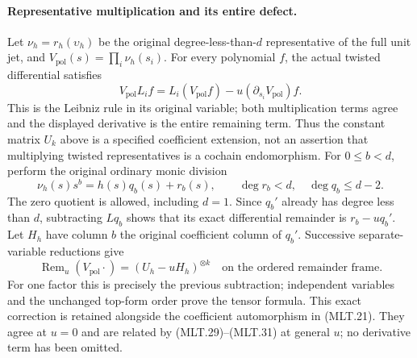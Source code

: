 \paragraph{Representative multiplication and its entire defect.}
Let \(\nu_h=r_h(\upsilon_h)\) be the original
degree-less-than-\(d\) representative of the
full unit jet, and \(V_{\mathrm{pol}}(s)
=\prod_i\nu_h(s_i)\). For every polynomial
\(f\), the actual twisted differential satisfies
\[
 V_{\mathrm{pol}}L_if
    =L_i(V_{\mathrm{pol}}f)
       -u(\partial_{s_i}V_{\mathrm{pol}})f.               \tag{MLT.29}
\]
This is the Leibniz rule in its original
variable; both multiplication terms agree
and the displayed derivative is the entire
remaining term. Thus the constant matrix
\(U_k\) above is a specified coefficient
extension, not an assertion that multiplying
twisted representatives is a cochain
endomorphism.
For \(0\le b<d\), perform the original
ordinary monic division
\[
 \nu_h(s)s^b=h(s)q_b(s)+r_b(s),\qquad
 \deg r_b<d,\quad \deg q_b\le d-2.
                                                               \tag{MLT.30}
\]
The zero quotient is allowed, including
\(d=1\). Since \(q_b'\) already has degree
less than \(d\), subtracting \(Lq_b\)
shows that its exact differential remainder
is \(r_b-uq_b'\).
Let \(H_h\) have column \(b\) the original
coefficient column of \(q_b'\).
Successive separate-variable reductions give
\[
 \operatorname{Rem}_u(V_{\mathrm{pol}}\cdot)
          =(U_h-uH_h)^{\otimes k}
          \quad\text{on the ordered remainder frame}.   \tag{MLT.31}
\]
For one factor this is precisely the previous
subtraction; independent variables and the
unchanged top-form order prove the tensor
formula. This exact correction is retained
alongside the coefficient automorphism in
(MLT.21). They agree at \(u=0\) and are
related by (MLT.29)--(MLT.31) at general
\(u\); no derivative term has been omitted.

